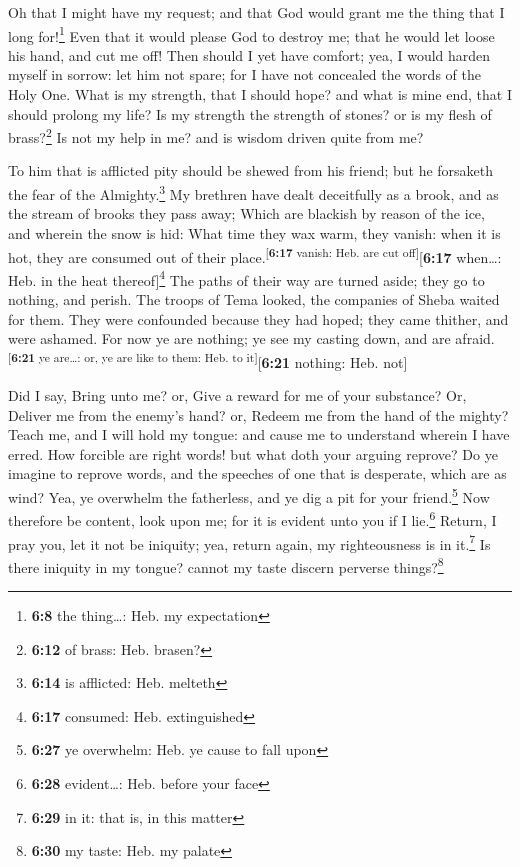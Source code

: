  Oh that I might have my request; and that God would grant
me the thing that I long for!\footnote{\textbf{6:8} the thing\ldots:
  Heb. my expectation}  Even that it would please God to
destroy me; that he would let loose his hand, and cut me off!
 Then should I yet have comfort; yea, I would harden
myself in sorrow: let him not spare; for I have not concealed the words
of the Holy One.  What is my strength, that I should
hope? and what is mine end, that I should prolong my life?
 Is my strength the strength of stones? or is my flesh of
brass?\footnote{\textbf{6:12} of brass: Heb. brasen?}  Is
not my help in me? and is wisdom driven quite from me?

 To him that is afflicted pity should be shewed from his
friend; but he forsaketh the fear of the Almighty.\footnote{\textbf{6:14}
  is afflicted: Heb. melteth}  My brethren have dealt
deceitfully as a brook, and as the stream of brooks they pass away;
 Which are blackish by reason of the ice, and wherein the
snow is hid:  What time they wax warm, they vanish: when
it is hot, they are consumed out of their
place.\textsuperscript{{[}\textbf{6:17} vanish: Heb. are cut
off{]}}{[}\textbf{6:17} when\ldots: Heb. in the heat
thereof{]}\footnote{\textbf{6:17} consumed: Heb. extinguished}
 The paths of their way are turned aside; they go to
nothing, and perish.  The troops of Tema looked, the
companies of Sheba waited for them.  They were confounded
because they had hoped; they came thither, and were ashamed.
 For now ye are nothing; ye see my casting down, and are
afraid.\textsuperscript{{[}\textbf{6:21} ye are\ldots: or, ye are like
to them: Heb. to it{]}}{[}\textbf{6:21} nothing: Heb. not{]}

 Did I say, Bring unto me? or, Give a reward for me of
your substance?  Or, Deliver me from the enemy's hand?
or, Redeem me from the hand of the mighty?  Teach me, and
I will hold my tongue: and cause me to understand wherein I have erred.
 How forcible are right words! but what doth your arguing
reprove?  Do ye imagine to reprove words, and the
speeches of one that is desperate, which are as wind? 
Yea, ye overwhelm the fatherless, and ye dig a pit for your
friend.\footnote{\textbf{6:27} ye overwhelm: Heb. ye cause to fall upon}
 Now therefore be content, look upon me; for it is
evident unto you if I lie.\footnote{\textbf{6:28} evident\ldots: Heb.
  before your face}  Return, I pray you, let it not be
iniquity; yea, return again, my righteousness is in it.\footnote{\textbf{6:29}
  in it: that is, in this matter}  Is there iniquity in
my tongue? cannot my taste discern perverse things?\footnote{\textbf{6:30}
  my taste: Heb. my palate}

